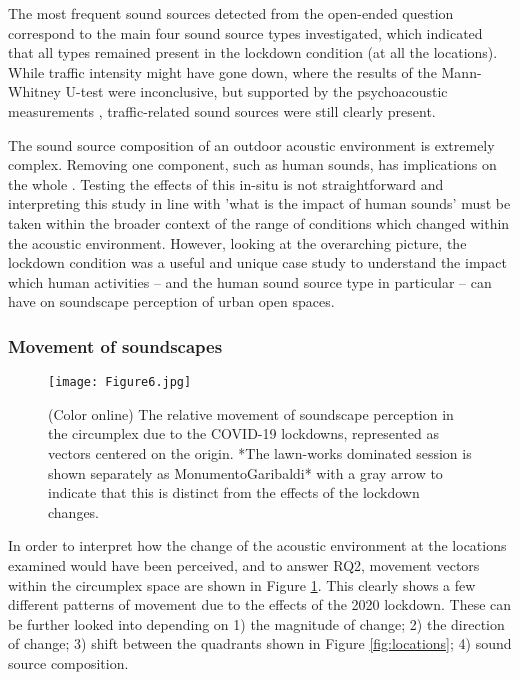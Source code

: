 The most frequent sound sources detected from the open-ended question correspond to the main four sound source types investigated, which indicated that all types remained present in the lockdown condition (at all the locations). While traffic intensity might have gone down, where the results of the Mann-Whitney U-test were inconclusive, but supported by the psychoacoustic measurements \citep{aletta_assessing_2020}, traffic-related sound sources were still clearly present.

The sound source composition of an outdoor acoustic environment is extremely complex. Removing one component, such as human sounds, has implications on the whole \citep{gordo_rapid_2021}. Testing the effects of this in-situ is not straightforward and interpreting this study in line with 'what is the impact of human sounds' must be taken within the broader context of the range of conditions which changed within the acoustic environment. However, looking at the overarching picture, the lockdown condition was a useful and unique case study to understand the impact which human activities -- and the human sound source type in particular -- can have on soundscape perception of urban open spaces.

\subsubsection{Movement of soundscapes}

\begin{figure}
    \centering
    \texttt{[image: Figure6.jpg]}
    \caption{(Color online) The relative movement of soundscape perception in the circumplex due to the COVID-19 lockdowns, represented as vectors centered on the origin. *The lawn-works dominated session is shown separately as MonumentoGaribaldi* with a gray arrow to indicate that this is distinct from the effects of the lockdown changes.}
    \label{fig:vectors}
\end{figure}

In order to interpret how the change of the acoustic environment at the locations examined would have been perceived, and to answer RQ2, movement vectors within the circumplex space are shown in Figure \ref{fig:vectors}. This clearly shows a few different patterns of movement due to the effects of the 2020 lockdown. These can be further looked into depending on 1) the magnitude of change; 2) the direction of change; 3) shift between the quadrants shown in Figure \ref{fig:locations}; 4) sound source composition. 

